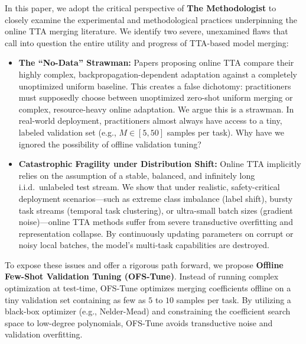 In this paper, we adopt the critical perspective of \textbf{The Methodologist} to closely examine the experimental and methodological practices underpinning the online TTA merging literature. We identify two severe, unexamined flaws that call into question the entire utility and progress of TTA-based model merging:

\begin{itemize}[leftmargin=*]
    \item \textbf{The ``No-Data'' Strawman:} Papers proposing online TTA compare their highly complex, backpropagation-dependent adaptation against a completely unoptimized uniform baseline. This creates a false dichotomy: practitioners must supposedly choose between unoptimized zero-shot uniform merging or complex, resource-heavy online adaptation. We argue this is a strawman. In real-world deployment, practitioners almost always have access to a tiny, labeled validation set (e.g., $M \in [5, 50]$ samples per task). Why have we ignored the possibility of offline validation tuning?
    \item \textbf{Catastrophic Fragility under Distribution Shift:} Online TTA implicitly relies on the assumption of a stable, balanced, and infinitely long i.i.d.\ unlabeled test stream. We show that under realistic, safety-critical deployment scenarios---such as extreme class imbalance (label shift), bursty task streams (temporal task clustering), or ultra-small batch sizes (gradient noise)---online TTA methods suffer from severe transductive overfitting and representation collapse. By continuously updating parameters on corrupt or noisy local batches, the model's multi-task capabilities are destroyed.
\end{itemize}

To expose these issues and offer a rigorous path forward, we propose \textbf{Offline Few-Shot Validation Tuning (OFS-Tune)}. Instead of running complex optimization at test-time, OFS-Tune optimizes merging coefficients offline on a tiny validation set containing as few as $5$ to $10$ samples per task. By utilizing a black-box optimizer (e.g., Nelder-Mead) and constraining the coefficient search space to low-degree polynomials, OFS-Tune avoids transductive noise and validation overfitting.

